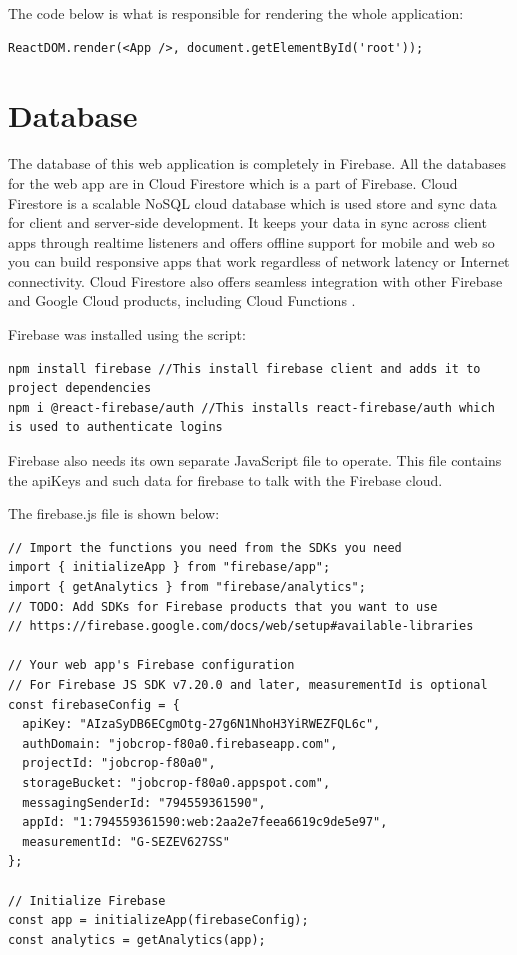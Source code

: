 The code below is what is responsible for rendering the whole application:
\begin{lstlisting}
ReactDOM.render(<App />, document.getElementById('root'));
\end{lstlisting}

\newpage
\section{Database}
The database of this web application is completely in Firebase. All the databases for the web app are in Cloud Firestore which is a part of Firebase. Cloud Firestore is a scalable NoSQL cloud database which is used store and sync data for client and server-side development. It keeps your data in sync across client apps through realtime listeners and offers offline support for mobile and web so you can build responsive apps that work regardless of network latency or Internet connectivity. Cloud Firestore also offers seamless integration with other Firebase and Google Cloud products, including Cloud Functions \parencite{Reference41}.

Firebase was installed using the script:
\begin{lstlisting}
npm install firebase //This install firebase client and adds it to project dependencies
npm i @react-firebase/auth //This installs react-firebase/auth which is used to authenticate logins
\end{lstlisting}

Firebase also needs its own separate JavaScript file to operate. This file contains the apiKeys and such data for firebase to talk with the Firebase cloud.

The firebase.js file is shown below:
\begin{lstlisting}
// Import the functions you need from the SDKs you need
import { initializeApp } from "firebase/app";
import { getAnalytics } from "firebase/analytics";
// TODO: Add SDKs for Firebase products that you want to use
// https://firebase.google.com/docs/web/setup#available-libraries

// Your web app's Firebase configuration
// For Firebase JS SDK v7.20.0 and later, measurementId is optional
const firebaseConfig = {
  apiKey: "AIzaSyDB6ECgmOtg-27g6N1NhoH3YiRWEZFQL6c",
  authDomain: "jobcrop-f80a0.firebaseapp.com",
  projectId: "jobcrop-f80a0",
  storageBucket: "jobcrop-f80a0.appspot.com",
  messagingSenderId: "794559361590",
  appId: "1:794559361590:web:2aa2e7feea6619c9de5e97",
  measurementId: "G-SEZEV627SS"
};

// Initialize Firebase
const app = initializeApp(firebaseConfig);
const analytics = getAnalytics(app);
\end{lstlisting}


